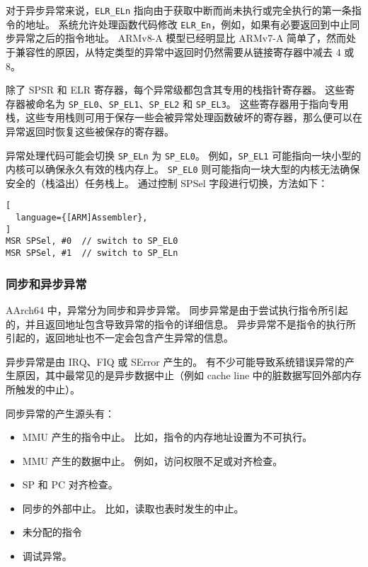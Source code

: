 对于异步异常来说，\lstinline!ELR_ELn! 指向由于获取中断而尚未执行或完全执行的第一条指令的地址。
系统允许处理函数代码修改 \lstinline!ELR_En!，例如，如果有必要返回到中止同步异常之后的指令地址。
ARMv8-A 模型已经明显比 ARMv7-A 简单了，然而处于兼容性的原因，从特定类型的异常中返回时仍然需要从链接寄存器中减去 4 或 8。

除了 SPSR 和 ELR 寄存器，每个异常级都包含其专用的栈指针寄存器。
这些寄存器被命名为 \lstinline!SP_EL0!、\lstinline!SP_EL1!、\lstinline!SP_EL2! 和 \lstinline!SP_EL3!。
这些寄存器用于指向专用栈，这些专用栈则可用于保存一些会被异常处理函数破坏的寄存器，那么便可以在异常返回时恢复这些被保存的寄存器。

异常处理代码可能会切换 \lstinline!SP_ELn! 为 \lstinline!SP_EL0!。
例如，\lstinline!SP_EL1! 可能指向一块小型的内核可以确保永久有效的栈内存上。
\lstinline!SP_EL0! 则可能指向一块大型的内核无法确保安全的（栈溢出）任务栈上。
通过控制 SPSel 字段进行切换，方法如下：

\begin{lstlisting}[
  language={[ARM]Assembler},
]
MSR SPSel, #0  // switch to SP_EL0
MSR SPSel, #1  // switch to SP_ELn
\end{lstlisting}

\subsubsection{同步和异步异常}

AArch64 中，异常分为同步和异步异常。
同步异常是由于尝试执行指令所引起的，并且返回地址包含导致异常的指令的详细信息。
异步异常不是指令的执行所引起的，返回地址也不一定会包含产生异常的信息。

异步异常是由 IRQ、FIQ 或 SError 产生的。
有不少可能导致系统错误异常的产生原因，其中最常见的是异步数据中止（例如 cache line 中的脏数据写回外部内存所触发的中止）。

同步异常的产生源头有：

\begin{itemize}
  \item MMU 产生的指令中止。
    比如，指令的内存地址设置为不可执行。
  \item MMU 产生的数据中止。
    例如，访问权限不足或对齐检查。
  \item SP 和 PC 对齐检查。
  \item 同步的外部中止。
    比如，读取也表时发生的中止。
  \item 未分配的指令
  \item 调试异常。
\end{itemize}

